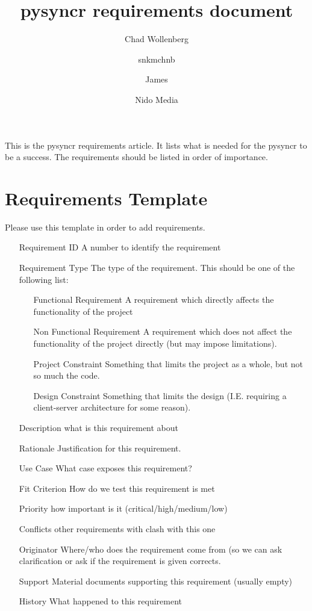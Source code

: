 \documentclass{article}
\author{Chad Wollenberg \and snkmchnb \and James \and Nido Media}
\title{pysyncr requirements document}
\begin{document}
\maketitle

\abstract

This is the pysyncr requirements article. It lists what is needed for
the pysyncr to be a success. The requirements should be listed in order
of importance.

\section{Requirements Template}

Please use this template in order to add requirements.

\begin{itemize}
  \item[Requirement ID] A number to identify the requirement
  \item[Requirement Type] The type of the requirement. This should be
  one of the following list:
  \begin{itemize}
    \item[Functional Requirement] A requirement which directly affects
    the functionality of the project
    \item[Non Functional Requirement] A requirement which does not
    affect the functionality of the project directly (but may impose
    limitations).
    \item[Project Constraint] Something that limits the project as a
    whole, but not so much the code.
    \item[Design Constraint] Something that limits the design (I.E.
    requiring a client-server architecture for some reason).
  \end{itemize}
  \item[Description] what is this requirement about
  \item[Rationale] Justification for this requirement.
  \item[Use Case] What case exposes this requirement?
  \item[Fit Criterion] How do we test this requirement is met
  \item[Priority] how important is it (critical/high/medium/low)
  \item[Conflicts] other requirements with clash with this one
  \item[Originator] Where/who does the requirement come from (so we can
  ask clarification or ask if the requirement is given corrects.
  \item[Support Material] documents supporting this requirement (usually empty)
  \item[History] What happened to this requirement
\end{itemize}
\end{document}
